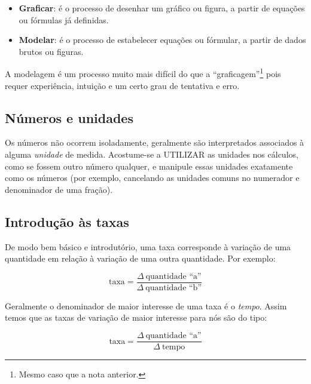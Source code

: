 \documentclass[pdftex, brazil, 12pt, twoside]{article}
\begin{document}
\begin{itemize}
\item \textbf{Graficar}: é o processo de desenhar um gráfico ou figura, a partir de equações
  ou fórmulas já definidas.
\item \textbf{Modelar}: é o processo de estabelecer equações ou fórmular, a partir de dados
  brutos ou figuras.
\end{itemize}

A modelagem é um processo muito mais difícil do que a ``graficagem''\footnote{Mesmo caso que a nota anterior.}
pois requer experiência, intuição e um certo grau de tentativa e erro.

\subsection{Números e unidades}
\label{aquecimento-numeros-unidades}

Os números não ocorrem isoladamente, geralmente são interpretados associados à alguma
\emph{unidade} de medida. Acostume-se a UTILIZAR as unidades nos cálculos, como se
fossem outro número qualquer, e manipule essas unidades exatamente como os números
(por exemplo, cancelando as unidades comuns no numerador e denominador de uma fração).

\subsection{Introdução às taxas}
\label{aquecimento-introducao-taxas}

De modo bem básico e introdutório, uma taxa corresponde à variação de uma quantidade
em relação à variação de uma outra quantidade. Por exemplo:

\begin{equation}
  \text{taxa} = \frac{\Delta\ \text{quantidade ``a''}}{\Delta\ \text{quantidade ``b''}}
\end{equation}

Geralmente o denominador de maior interesse de uma taxa é o \emph{tempo}. Assim temos
que as taxas de variação de maior interesse para nós são do tipo:

\begin{equation}
  \text{taxa} = \frac{\Delta\ \text{quantidade ``a''}}{\Delta\ \text{tempo}}
\end{equation}
\end{document}
